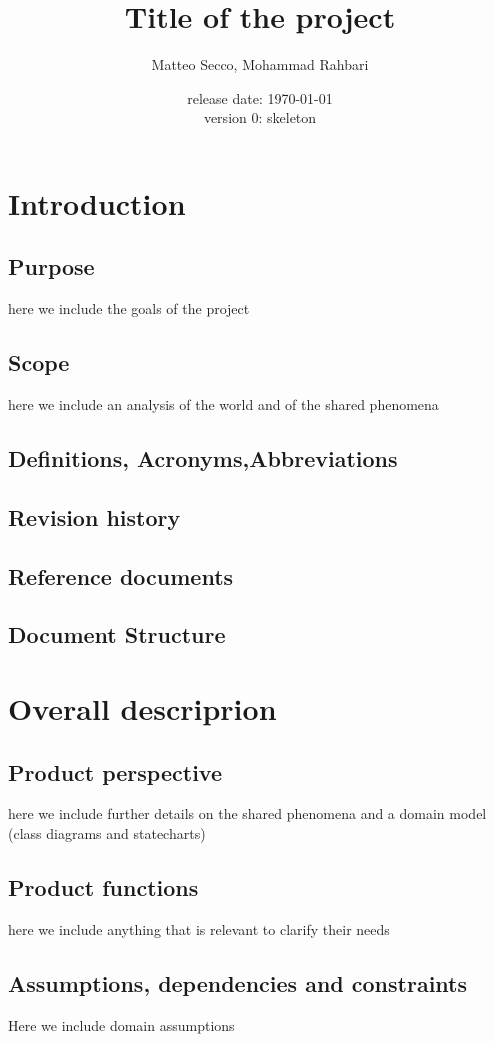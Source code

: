 \documentclass{article}
\title{Title of the project}
\date{release date: \today\\version 0: skeleton}
\author{Matteo Secco, Mohammad Rahbari}
\begin{document}
\maketitle
\newpage
\tableofcontents
\pagebreak
{}
\section{Introduction}
	\subsection{Purpose} here we	 include	 the	 goals of the project	
	\subsection{Scope} here we include an analysis of the world and of the shared phenomena
	\subsection{Definitions, Acronyms,Abbreviations}
	\subsection{Revision history}
	\subsection{Reference documents}
	\subsection{Document Structure}
\section{Overall descriprion}
	\subsection{Product perspective} here we include further details on the shared phenomena and a domain model (class diagrams and statecharts)
	\subsection{Product functions}here we include anything that is relevant to clarify their needs
	\subsection{Assumptions, dependencies and constraints} Here we include domain assumptions
\end{document}

